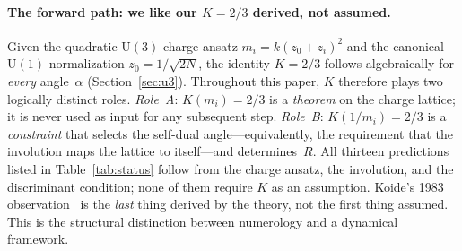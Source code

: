 \documentclass[12pt,a4paper]{article}
\newcommand{\UU}{\mathrm{U}}
\begin{document}
\paragraph{The forward path: we like our $K = 2/3$ derived, not assumed.}
Given the quadratic $\UU(3)$ charge ansatz $m_i = k(z_0+z_i)^2$
and the canonical $\UU(1)$ normalization $z_0 = 1/\sqrt{2N}$,
the identity $K = 2/3$ follows algebraically for \emph{every}
angle~$\alpha$ (Section~\ref{sec:u3}).
Throughout this paper, $K$ therefore plays two logically distinct
roles.  \emph{Role~A}: $K(m_i) = 2/3$ is a \emph{theorem} on
the charge lattice; it is never used as input for any subsequent step.
\emph{Role~B}: $K(1/m_i) = 2/3$ is a \emph{constraint} that
selects the self-dual angle---equivalently, the requirement that
the involution maps the lattice to itself---and determines~$R$.
All thirteen predictions listed in Table~\ref{tab:status} follow
from the charge ansatz, the involution, and the discriminant
condition; none of them require $K$ as an assumption.
Koide's 1983 observation~\cite{Koide:1983qe} is the \emph{last}
thing derived by the theory, not the first thing assumed.  This
is the structural distinction between numerology and a dynamical
framework.
\end{document}
